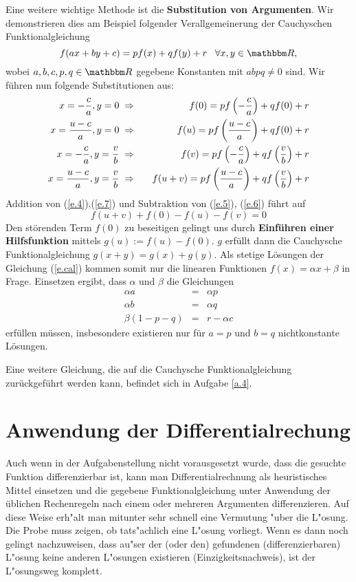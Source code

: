 \documentclass[11pt]{article}
\begin{document}
Eine weitere wichtige Methode ist die {\bf Substitution von Argumenten}.  Wir
demonstrieren dies am Beispiel folgender Verallgemeinerung der Cauchyschen
Funktionalgleichung
\begin{equation}\label{e.cal}
f(ax+by+c)=pf(x)+qf(y)+r\;\;\;\forall x,y\in \R,
\end{equation}
wobei $a,b,c,p,q\in\R$ gegebene Konstanten mit $abpq\neq 0$ sind. Wir
f\"{u}hren nun folgende Substitutionen aus:
\begin{eqnarray}
\label{e.4}x=-\frac{c}{a},y=0\;&\Rightarrow\ 
&\;\;f(0)=pf\left(-\frac{c}{a}\right)+q f(0)+r\\
\label{e.5}x=\frac{u-c}{a},y=0\;&\Rightarrow\ 
&\;\;f(u)=pf\left(\frac{u-c}{a}\right)+q f(0)+r\\
\label{e.6}x=-\frac{c}{a},y=\frac{v}{b}\;&\Rightarrow\  &\;\;
f(v)=pf\left(-\frac{c}{a}\right)+qf\left(\frac{v}{b}\right)+r\\
\label{e.7}x=\frac{u-c}{a},y=\frac{v}{b}\;&\Rightarrow\  &
\;\;f(u+v)=pf\left(\frac{u-c}{a}\right)+qf\left(\frac{v}{b}\right)+r
\end{eqnarray}
Addition von (\ref{e.4}),(\ref{e.7}) und Subtraktion von (\ref{e.5}),
(\ref{e.6}) f\"{u}hrt auf 
\begin{equation} 
f(u+v)+f(0)-f(u)-f(v)=0
\end{equation}
Den st\"{o}renden Term $f(0)$ zu beseitigen gelingt uns durch {\bf
Einf\"{u}hren einer Hilfsfunktion} mittels $g(u):=f(u)-f(0)$. $g$ erf\"{u}llt
dann die Cauchysche Funktionalgleichung $g(x+y)=g(x)+g(y)$. Als stetige
L\"{o}sungen der Gleichung (\ref{e.cal}) kommen somit nur die linearen
Funktionen $f(x)=\alpha x+\beta$ in Frage. Einsetzen ergibt, da{ss} $\alpha $
und $\beta$ die Gleichungen
\begin{eqnarray*}
\alpha a&=&\alpha p\\
\alpha b&=&\alpha q\\
\beta(1-p-q)&=&r-\alpha c
\end{eqnarray*}
erf\"{u}llen m\"{u}ssen, insbesondere existieren nur f\"{u}r $a=p$ und $b=q$
nichtkonstante L\"{o}sungen.

Eine weitere Gleichung, die auf die Cauchysche Funktionalgleichung
zur\"{u}ckgef\"{u}hrt werden kann, befindet sich in Aufgabe \ref{a.4}.

\section{Anwendung der Differentialrechung}

Auch wenn in der Aufgabenstellung nicht vorausgesetzt wurde, dass die gesuchte
Funktion differenzierbar ist, kann man Differentialrechnung als heuristisches
Mittel einsetzen und die gegebene Funktionalgleichung unter Anwendung der
\"{u}blichen Rechenregeln nach einem oder mehreren Argumenten differenzieren.
Auf diese Weise erh"alt man mitunter sehr schnell eine Vermutung "uber die
L"osung. Die Probe muss zeigen, ob tats"achlich eine L"osung vorliegt. Wenn es
dann noch gelingt nachzuweisen, dass au"ser der (oder den) gefundenen
(differenzierbaren) L"osung keine anderen L"osungen existieren
(Einzigkeitsnachweis), ist der L"osungsweg komplett. \vspace*{1ex}
\end{document}
